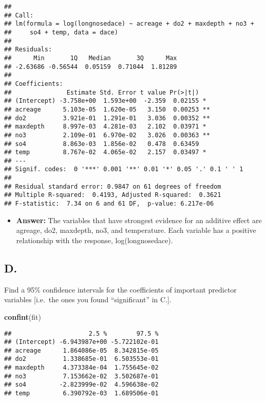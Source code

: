 \documentclass[]{article}
\newenvironment{Shaded}{\begin{snugshade}}{\end{snugshade}}
\newcommand{\KeywordTok}[1]{\textcolor[rgb]{0.13,0.29,0.53}{\textbf{#1}}}
\newcommand{\NormalTok}[1]{#1}
\providecommand{\tightlist}{%
  \setlength{\itemsep}{0pt}\setlength{\parskip}{0pt}}
\begin{document}
\begin{verbatim}
## 
## Call:
## lm(formula = log(longnosedace) ~ acreage + do2 + maxdepth + no3 + 
##     so4 + temp, data = dace)
## 
## Residuals:
##      Min       1Q   Median       3Q      Max 
## -2.63686 -0.56544  0.05159  0.71044  1.81289 
## 
## Coefficients:
##               Estimate Std. Error t value Pr(>|t|)   
## (Intercept) -3.758e+00  1.593e+00  -2.359  0.02155 * 
## acreage      5.103e-05  1.620e-05   3.150  0.00253 **
## do2          3.921e-01  1.291e-01   3.036  0.00352 **
## maxdepth     8.997e-03  4.281e-03   2.102  0.03971 * 
## no3          2.109e-01  6.970e-02   3.026  0.00363 **
## so4          8.863e-03  1.856e-02   0.478  0.63459   
## temp         8.767e-02  4.065e-02   2.157  0.03497 * 
## ---
## Signif. codes:  0 '***' 0.001 '**' 0.01 '*' 0.05 '.' 0.1 ' ' 1
## 
## Residual standard error: 0.9847 on 61 degrees of freedom
## Multiple R-squared:  0.4193, Adjusted R-squared:  0.3621 
## F-statistic:  7.34 on 6 and 61 DF,  p-value: 6.217e-06
\end{verbatim}

\begin{itemize}
\tightlist
\item
  \textbf{Answer:} The variables that have strongest evidence for an
  additive effect are agreage, do2, maxdepth, no3, and temperature. Each
  variable has a positive relationship with the response,
  log(longnosedace).
\end{itemize}

\subsection{D.}\label{d.-1}

Find a 95\% confidence intervals for the coefficients of important
predictor variables {[}i.e.~the ones you found ``significant'' in C.{]}.

\begin{Shaded}
\begin{Highlighting}[]
\KeywordTok{confint}\NormalTok{(fit)}
\end{Highlighting}
\end{Shaded}

\begin{verbatim}
##                     2.5 %        97.5 %
## (Intercept) -6.943987e+00 -5.722102e-01
## acreage      1.864086e-05  8.342815e-05
## do2          1.338685e-01  6.503553e-01
## maxdepth     4.373384e-04  1.755645e-02
## no3          7.153662e-02  3.502687e-01
## so4         -2.823999e-02  4.596638e-02
## temp         6.390792e-03  1.689506e-01
\end{verbatim}
\end{document}
